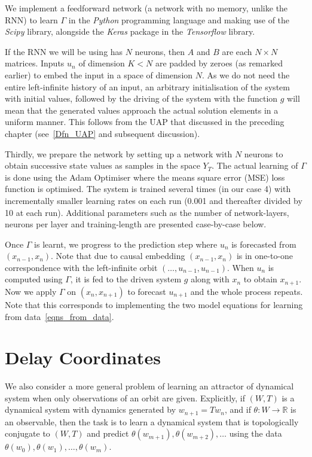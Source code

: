We implement a feedforward network (a network with no memory, unlike the RNN) to learn $\Gamma$ in the \emph{Python} programming language and making use of the \emph{Scipy} library, alongside the \emph{Keras} package in the \emph{Tensorflow} library.

If the RNN we will be using has $N$ neurons, then $A$ and $B$ are each $N\times{N}$ matrices. Inputs $u_n$ of dimension $K < N$ are padded by zeroes (as remarked earlier) to embed the input in a space of dimension $N$. 
As we do not need the entire left-infinite history of an input, an arbitrary initialisation of the system with initial values, followed by the driving of the system with the function $g$ will mean that the generated values approach the actual solution elements in a uniform manner. This follows from the UAP that discussed in the preceding chapter (see~\ref{Dfn_UAP} and subsequent discussion).

Thirdly, we prepare the network by setting up a network with $N$ neurons  to obtain successive state values as samples in the space $Y_T$. 
The actual learning of $\Gamma$ is done using the Adam Optimiser where the means square error (MSE) loss function is optimised. 
The system is trained several times (in our case 4) with incrementally smaller learning rates on each run (0.001 and thereafter divided by 10 at each run). 
Additional parameters such as the number of network-layers, neurons per layer and training-length are presented case-by-case below.

Once $\Gamma$ is learnt, we progress to the prediction step where $u_n$ is forecasted from $(x_{n-1},x_{n})$. Note that  due to causal embedding $(x_{n-1},x_{n})$ is in one-to-one correspondence with the left-infinite orbit $(\ldots,u_{n-1},u_{n-1})$. 
When $u_n$ is computed using $\Gamma$, it is fed to the driven system $g$ along with  $x_n$ to obtain $x_{n+1}$. Now we apply $\Gamma$ on $(x_n,x_{n+1})$ to forecast $u_{n+1}$ and the whole process repeats. Note that this corresponds to implementing the two model equations for learning from data~\eqref{eqns_from_data}.

\section{Delay Coordinates}

We also consider a more general problem of learning an attractor of dynamical system when only observations of an orbit are given. 
Explicitly, if $(W,T)$ is a dynamical system with dynamics generated by $w_{n+1}=Tw_n$, and if $\theta:W \to \mathbb{R}$ is an observable, then the task is to learn a dynamical system that is topologically conjugate to $(W,T)$ and predict $\theta(w_{m+1}),\theta(w_{m+2}),\ldots$ using the data $\theta(w_{0}),\theta(w_{1}),\ldots,\theta(w_{m})$.  

